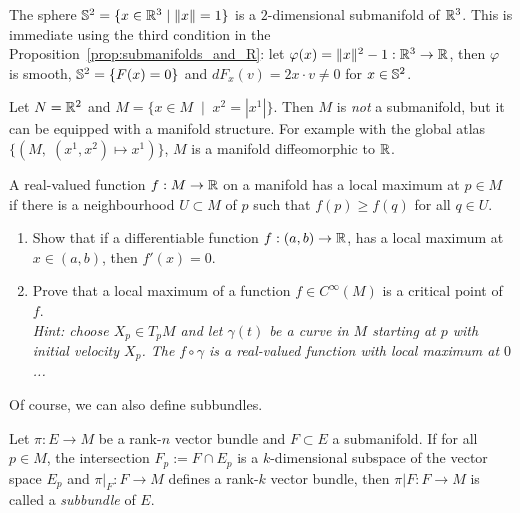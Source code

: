 \begin{example}\label{ex:s2}
  The sphere $\mathbb{S}^2 = \{x\in\mathbb{R}^3 \mid \|x\| = 1\}$ is a $2$-dimensional submanifold of $\mathbb{R}^3$.
  This is immediate using the third condition in the Proposition~\ref{prop:submanifolds_and_R}: let $\varphi(x) = \|x\|^2 -1 : \mathbb{R}^3 \to \mathbb{R}$, then $\varphi$ is smooth, $\mathbb{S}^2 = \{F(x)=0\}$ and $dF_x(v)= 2x\cdot v \neq 0$ for $x\in\mathbb{S}^2$.
\end{example}

\begin{example}
  Let $N = \mathbb{R}^2$ and $M = \{ x\in M \;\mid\; x^2 = |x^1| \}$.
  Then $M$ is \emph{not} a submanifold, but it can be equipped with a manifold structure.
  For example with the global atlas $\{(M,\; (x^1,x^2)\mapsto x^1)\}$, $M$ is a manifold diffeomorphic to $\mathbb{R}$.
\end{example}

\begin{exercise}
  A real-valued function $f:M\to\mathbb{R}$ on a manifold has a local maximum at $p\in M$ if there is a neighbourhood $U\subset M$ of $p$ such that $f(p) \geq f(q)$ for all $q\in U$.
  \begin{enumerate}
    \item Show that if a differentiable function $f:(a,b)\to\mathbb{R}$, has a local maximum at $x\in (a,b)$, then $f'(x) = 0$.
    \item Prove that a local maximum of a function $f\in C^\infty(M)$ is a critical point of $f$.\\
    \textit{\small Hint: choose $X_p\in T_pM$ and let $\gamma(t)$ be a curve in $M$ starting at $p$ with initial velocity $X_p$. The $f\circ \gamma$ is a real-valued function with local maximum at $0$...}
  \end{enumerate}
\end{exercise}

Of course, we can also define subbundles.
\begin{definition}
  Let $\pi:E \to M$ be a rank-$n$ vector bundle and $F\subset E$ a submanifold.
  If for all $p\in M$, the intersection $F_p := F\cap E_p$ is a $k$-dimensional subspace of the vector space $E_p$ and $\pi|_F : F \to M$ defines a rank-$k$ vector bundle, then $\pi|F: F \to M$ is called a \emph{subbundle} of $E$.
\end{definition}


